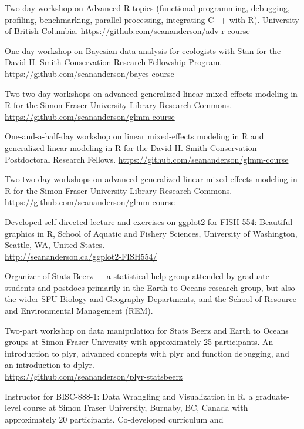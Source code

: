 \begin{description}
\tightlist
\item[2019]
Two-day workshop on Advanced R topics (functional programming,
debugging, profiling, benchmarking, parallel processing, integrating C++
with R). University of British Columbia.
\url{https://github.com/seananderson/adv-r-course}
\item[2018]
One-day workshop on Bayesian data analysis for ecologists with Stan for
the David H. Smith Conservation Research Fellowship Program.
\url{https://github.com/seananderson/bayes-course}
\item[2018]
Two two-day workshops on advanced generalized linear mixed-effects
modeling in R for the Simon Fraser University Library Research Commons.
\url{https://github.com/seananderson/glmm-course}
\item[2017]
One-and-a-half-day workshop on linear mixed-effects modeling in R and
generalized linear modeling in R for the David H. Smith Conservation
Postdoctoral Research Fellows.
\url{https://github.com/seananderson/glmm-course}
\item[2016]
Two two-day workshops on advanced generalized linear mixed-effects
modeling in R for the Simon Fraser University Library Research Commons.
\url{https://github.com/seananderson/glmm-course}
\item[2014--16]
Developed self-directed lecture and exercises on ggplot2 for FISH 554:
Beautiful graphics in R, School of Aquatic and Fishery Sciences,
University of Washington, Seattle, WA, United States.\\
\url{http://seananderson.ca/ggplot2-FISH554/}
\item[2013--14]
Organizer of Stats Beerz --- a statistical help group attended by
graduate students and postdocs primarily in the Earth to Oceans research
group, but also the wider SFU Biology and Geography Departments, and the
School of Resource and Environmental Management (REM).
\item[2013]
Two-part workshop on data manipulation for Stats Beerz and Earth to
Oceans groups at Simon Fraser University with approximately 25
participants. An introduction to plyr, advanced concepts with plyr and
function debugging, and an introduction to dplyr.\\
\url{https://github.com/seananderson/plyr-statsbeerz}
\item[2013]
Instructor for BISC-888-1: Data Wrangling and Visualization in R, a
graduate-level course at Simon Fraser University, Burnaby, BC, Canada
with approximately 20 participants. Co-developed curriculum and

\end{description}
